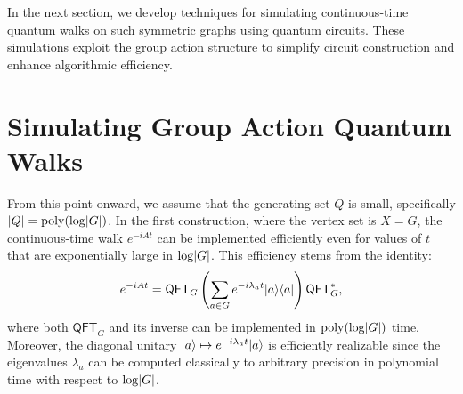 \documentclass[12pt]{report}
\newcommand{\qft}{\mathsf{QFT}}
\begin{document}



In the next section, we develop techniques for simulating continuous-time quantum walks on such symmetric graphs using quantum circuits. These simulations exploit the group action structure to simplify circuit construction and enhance algorithmic efficiency.




\chapter{Simulating Group Action Quantum Walks}\label{chap:simulating}


From this point onward, we assume that the generating set \( Q \) is small, specifically \( \lvert Q\rvert = \operatorname{poly}(\log \lvert G\rvert) \). In the first construction, where the vertex set is \( X = G \), the continuous-time walk \( e^{-iAt} \) can be implemented efficiently even for values of \( t \) that are exponentially large in \( \log \lvert G\rvert \). This efficiency stems from the identity:
\begin{equation}
    \label{eq:adjmat-fb}
    e^{-iAt} = \qft_G \left( \sum_{a \in G} e^{-i\lambda_a t} \ket{a} \bra{a} \right) \qft_G^*,
\end{equation}
where both \( \qft_G \) and its inverse can be implemented in \( \operatorname{poly}(\log \lvert G\rvert) \) time. Moreover, the diagonal unitary \( \lvert a\rangle \mapsto e^{-i\lambda_a t} \lvert a\rangle \) is efficiently realizable since the eigenvalues \( \lambda_a \) can be computed classically to arbitrary precision in polynomial time with respect to \( \log \lvert G\rvert \).
\end{document}
